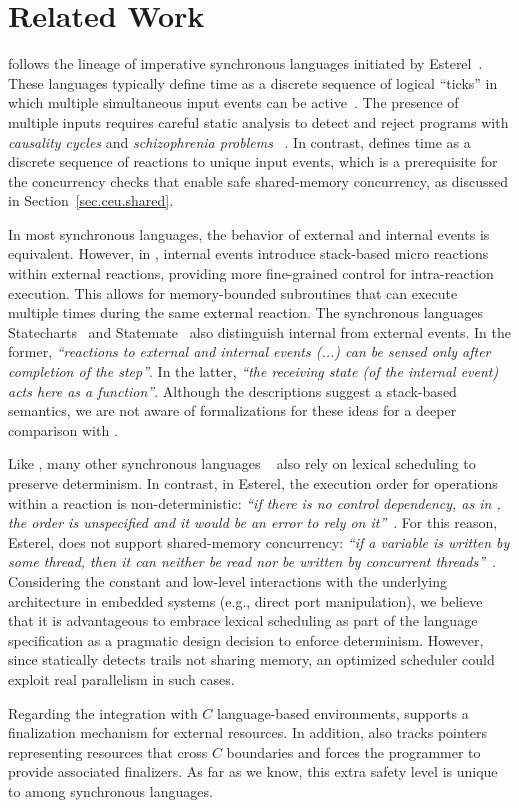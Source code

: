 \section{Related Work}

\CEU follows the lineage of imperative synchronous languages initiated by
Esterel~\cite{esterel.ieee91}.
These languages typically define time as a discrete sequence of logical
``ticks'' in which multiple simultaneous input events can be
active~\cite{ceu.tecs17}.
%
The presence of multiple inputs requires careful static analysis to detect and
reject programs with \emph{causality cycles} and \emph{schizophrenia problems}%
~\cite{esterel.constructive}.
%
In contrast, \CEU defines time as a discrete sequence of reactions to
unique input events, which is a prerequisite for the concurrency checks that
enable safe shared-memory concurrency, as discussed in
Section~\ref{sec.ceu.shared}.

In most synchronous languages, the behavior of external and internal events is
equivalent.
However, in \CEU, internal events introduce stack-based micro reactions within
external reactions, providing more fine-grained control for intra-reaction
execution.
%
This allows for memory-bounded subroutines that can execute multiple times
during the same external reaction.
%
The synchronous languages Statecharts~\cite{statecharts.variants} and
Statemate~\cite{statecharts.statemate} also distinguish internal from external
events.
In the former, \emph{``reactions to external and internal events (...) can be
sensed only after completion of the step''}.
In the latter, \emph{``the receiving state (of the internal event) acts here as
a function''}.
Although the descriptions suggest a stack-based semantics, we are not aware of
formalizations for these ideas for a deeper comparison with \CEU.

Like \CEU, many other synchronous languages%
~\cite{rp.rc,wsn.protothreads,wsn.sol,rp.synchc,rp.pretc}
also rely on lexical scheduling to preserve determinism.
%
In contrast, in Esterel, the execution order for operations within a reaction
is non-deterministic: \emph{``if there is no control dependency, as in
,
the order is unspecified and it would be an error to rely on
it''}~\cite{esterel.primer}.
%
For this reason, Esterel, does not support shared-memory concurrency:
\emph{``if a variable is written by some thread, then it can neither be read
nor be written by concurrent threads''}~\cite{esterel.primer}.
%
Considering the constant and low-level interactions with the underlying
architecture in embedded systems (e.g., direct port manipulation), we believe
that it is advantageous to embrace lexical scheduling as part of the language
specification as a pragmatic design decision to enforce determinism.
%
However, since \CEU statically detects trails not sharing memory, an optimized
scheduler could exploit real parallelism in such cases.

Regarding the integration with $C$ language-based environments, \CEU
supports a finalization mechanism for external resources.
%
In addition, \CEU also tracks pointers representing resources that cross $C$
boundaries and forces the programmer to provide associated finalizers.
%
As far as we know, this extra safety level is unique to \CEU among synchronous
languages.

